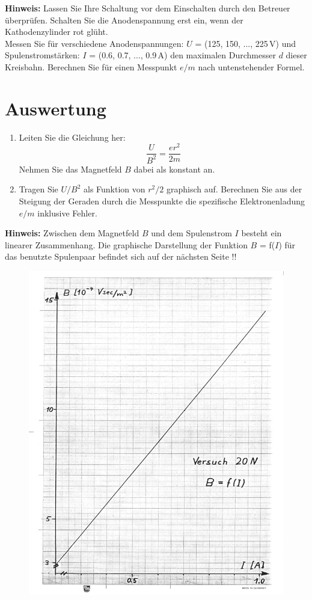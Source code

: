 \textbf{Hinweis:} Lassen Sie Ihre Schaltung vor dem Einschalten durch den Betreuer überprüfen. Schalten Sie die Anodenspannung erst ein, wenn der Kathodenzylinder rot glüht.\\

\noindent
Messen Sie für verschiedene Anodenspannungen: $U$ = (125, 150, ..., 225\,V) und Spulenstromstärken: $I$ = (0.6, 0.7, ..., 0.9\,A) den maximalen Durchmesser $d$ dieser Kreisbahn. Berechnen Sie für einen Messpunkt $e/m$ nach untenstehender Formel.

\section{Auswertung} 

\begin{enumerate}
	\item Leiten Sie die Gleichung her:
		\begin{equation}
			\frac{U}{B^2} = \frac{er^2}{2m}
		\end{equation}
		Nehmen Sie das Magnetfeld $B$ dabei als konstant an.
	\item Tragen Sie $U/B^2$ als Funktion von $r^2/2$ graphisch auf. Berechnen Sie aus der Steigung der Geraden durch die Messpunkte die spezifische Elektronenladung $e/m$ inklusive Fehler.
\end{enumerate}

\textbf{Hinweis:} Zwischen dem Magnetfeld $B$ und dem Spulenstrom $I$ besteht ein linearer Zusammenhang. Die graphische Darstellung der Funktion $B$ = f($I$) für das benutzte Spulenpaar befindet sich auf der nächsten Seite !!

\begin{figure}[h]
	\centering
		\includegraphics[width=1.00\textwidth]{Versuch_19-20/Abbildungen/Eichung-HHSpulen.jpg}
	\label{fig:Eichung-HHSpulen}
\end{figure}
